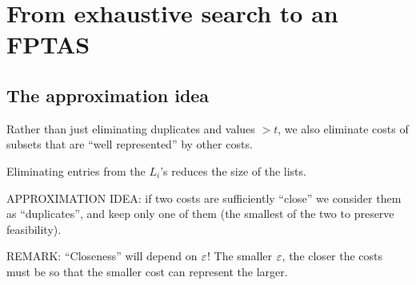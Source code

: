 \section{From exhaustive search to an FPTAS}
\subsection{The approximation idea}
Rather than just eliminating duplicates and values $>t$, we also eliminate costs of subsets that are ``well represented'' by other costs.

Eliminating entries from the $L_i$'s reduces the size of the lists.

APPROXIMATION IDEA: if two costs are sufficiently ``close'' we consider them as ``duplicates'', and keep only one of them (the smallest of the two to preserve feasibility).
\begin{notesresult}
REMARK: ``Closeness'' will depend on $\varepsilon$! The smaller $\varepsilon$, the closer the costs must be so that the smaller cost can represent the larger.
\end{notesresult}
